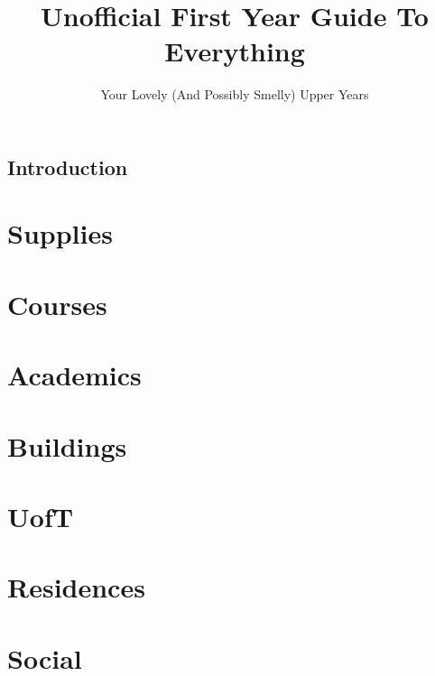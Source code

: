 \documentclass[12pt]{report}
\author{Your Lovely (And Possibly Smelly) Upper Years}
\title{Unofficial First Year Guide To Everything}
\begin{document}
\maketitle
\tableofcontents

\section{Introduction}

\chapter{Supplies}


\chapter{Courses}


\chapter{Academics}


\chapter{Buildings}


\chapter{UofT}


\chapter{Residences}


\chapter{Social}

\end{document}
